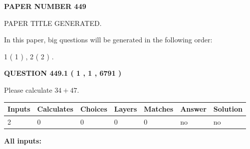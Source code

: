 \documentclass[12pt]{article}
\begin{document}
   
   
   
\newpage 
\setcounter{page}{ 
   449001 } 
   
   
   
   
 {\textbf{ \Large{ PAPER NUMBER  449  }}}
   
   
\vspace{0.2in}
   
   
   
   
   
   
   
   
 \vspace{0.2in}
 
 
 
 
   
   
 PAPER TITLE GENERATED.
   
   
   
\vspace{0.2in}
   
In this paper, big questions will be generated in the following order: 
   
   
   1 ( 1 )
 ,
   2 ( 2 )
 .
  
\vspace{0.2in}
  
{\textbf{\Large{QUESTION
449.1 
 ( 1 , 1 , 6791 )
}}}
  
  
 
Please calculate $ %
34 +  %
47 $.
 
 
   
   
   
   
\noindent\begin{tabular}{|l|l|l|l|l|l|l|}
 \hline
Inputs & Calculates & Choices & Layers & Matches & Answer & Solution \\ \hline
 2  & 
 0  & 
 0
  & 
 0  & 
 0  & 
  no & 
  no 
  \\ \hline
 \end{tabular}
   
   
   
   
\noindent{}
   
   
   
   
\noindent\vspace{0.1in}\hspace{-0.08in} {\textbf{\Large{All inputs: }}}
   
   
  
\end{document}
